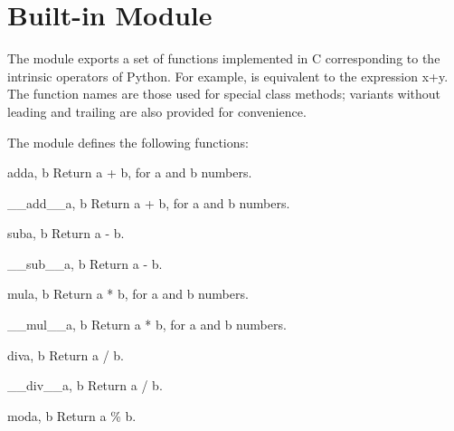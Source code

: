 
\section{Built-in Module }	%

The  module exports a set of functions implemented in C
corresponding to the intrinsic operators of Python.  For example,
{} is equivalent to the expression x+y.  The
function names are those used for special class methods; variants without
leading and trailing \samp{__} are also provided for convenience.

The  module defines the following functions:

\renewcommand{\indexsubitem}{(in module operator)}

\begin{funcdesc}{add}{a, b}
Return a + b, for a and b numbers.
\end{funcdesc}

\begin{funcdesc}{__add__}{a, b}
Return a + b, for a and b numbers.
\end{funcdesc}

\begin{funcdesc}{sub}{a, b}
Return a - b.
\end{funcdesc}

\begin{funcdesc}{__sub__}{a, b}
Return a - b.
\end{funcdesc}

\begin{funcdesc}{mul}{a, b}
Return a * b, for a and b numbers.
\end{funcdesc}

\begin{funcdesc}{__mul__}{a, b}
Return a * b, for a and b numbers.
\end{funcdesc}

\begin{funcdesc}{div}{a, b}
Return a / b.
\end{funcdesc}

\begin{funcdesc}{__div__}{a, b}
Return a / b.
\end{funcdesc}

\begin{funcdesc}{mod}{a, b}
Return a \% b.
\end{funcdesc}

